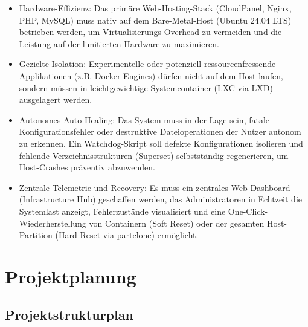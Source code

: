 \documentclass[11pt,
a4paper,
numbers=nonperiod,
footsepline,
oneside,
numbers=noenddot,
bibliography=totoc
]{scrartcl}
\begin{document}
\begin{itemize}

\item{Hardware-Effizienz:} Das primäre Web-Hosting-Stack (CloudPanel, Nginx, PHP, MySQL) muss nativ auf dem Bare-Metal-Host (Ubuntu 24.04 LTS) betrieben werden, um Virtualisierungs-Overhead zu vermeiden und die Leistung auf der limitierten Hardware zu maximieren.

\item{Gezielte Isolation:} Experimentelle oder potenziell ressourcenfressende Applikationen (z.B. Docker-Engines) dürfen nicht auf dem Host laufen, sondern müssen in leichtgewichtige Systemcontainer (LXC via LXD) ausgelagert werden.

\item{Autonomes Auto-Healing:} Das System muss in der Lage sein, fatale Konfigurationsfehler oder destruktive Dateioperationen der Nutzer autonom zu erkennen. Ein Watchdog-Skript soll defekte Konfigurationen isolieren und fehlende Verzeichnisstrukturen (Superset) selbstständig regenerieren, um Host-Crashes präventiv abzuwenden.

\item{Zentrale Telemetrie und Recovery:} Es muss ein zentrales Web-Dashboard (Infrastructure Hub) geschaffen werden, das Administratoren in Echtzeit die Systemlast anzeigt, Fehlerzustände visualisiert und eine One-Click-Wiederherstellung von Containern (Soft Reset) oder der gesamten Host-Partition (Hard Reset via partclone) ermöglicht.

\end{itemize}

\newpage
\section{Projektplanung}
\bigskip
\subsection{Projektstrukturplan}
\end{document}
